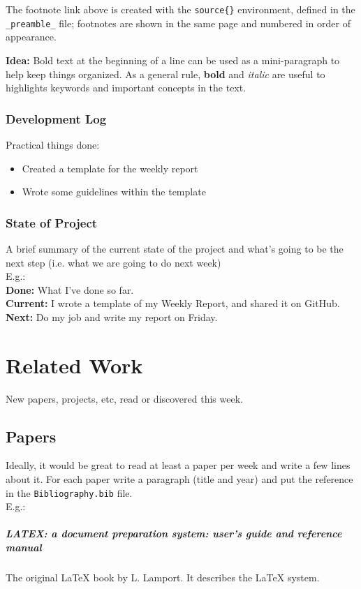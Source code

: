 The footnote link above is created with the \verb|source{}| environment, defined in the \verb|_preamble_| file;
footnotes are shown in the same page and numbered in order of appearance.

\textbf{Idea:} Bold text at the beginning of a line can be used as a mini-paragraph to help keep things organized.
As a general rule, \textbf{bold} and \textit{italic} are useful to highlights keywords and important concepts in the text.
%
\subsection{Development Log}
Practical things done:
\begin{itemize}
  \item Created a template for the weekly report
  \item Wrote some guidelines within the template
\end{itemize}
%
\subsection{State of Project}
A brief summary of the current state of the project and what's going to be the next step (i.e. what we are going to do next week)\\
E.g.:\\
%
\noindent
\textbf{Done:} What I've done so far.\\
\textbf{Current:} I wrote a template of my Weekly Report, and shared it on GitHub.\\
\textbf{Next:} Do my job and write my report on Friday.
%

\chapter{Related Work}
New papers, projects, etc, read or discovered this week.
\section{Papers}
Ideally, it would be great to read at least a paper per week and write a few lines about it. For each paper write a paragraph (title and year) and put the reference in the \verb|Bibliography.bib| file.\\
E.g.:
\paragraph{LATEX: a document preparation system: user's guide and reference manual}\cite{lamport1994latex} The original LaTeX book  by L. Lamport. It describes the LaTeX system.
